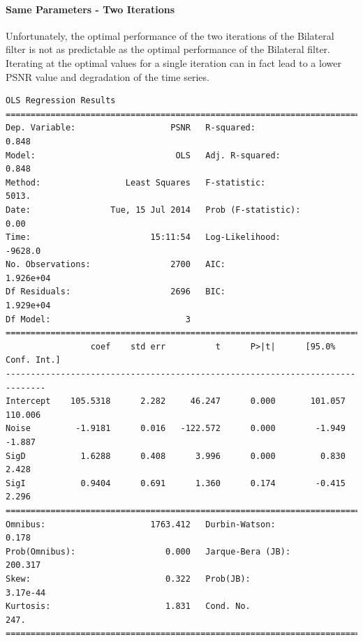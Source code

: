 \documentclass[11pt]{article}
\theoremstyle{definition}
\begin{document}
\paragraph{Same Parameters - Two Iterations}

Unfortunately, the optimal performance of the two iterations of the Bilateral filter is not as predictable as the optimal performance of the Bilateral filter. Iterating at the optimal values for a single iteration can in fact lead to a lower PSNR value and degradation of the time series.

{\footnotesize
\begin{lstlisting}[caption = Time Series 1 - Bilateral Filter 2 Same Iterations OLS Model, label = {2samebilateral1}]
                            OLS Regression Results                            
==============================================================================
Dep. Variable:                   PSNR   R-squared:                       0.848
Model:                            OLS   Adj. R-squared:                  0.848
Method:                 Least Squares   F-statistic:                     5013.
Date:                Tue, 15 Jul 2014   Prob (F-statistic):               0.00
Time:                        15:11:54   Log-Likelihood:                -9628.0
No. Observations:                2700   AIC:                         1.926e+04
Df Residuals:                    2696   BIC:                         1.929e+04
Df Model:                           3                                         
==============================================================================
                 coef    std err          t      P>|t|      [95.0% Conf. Int.]
------------------------------------------------------------------------------
Intercept    105.5318      2.282     46.247      0.000       101.057   110.006
Noise         -1.9181      0.016   -122.572      0.000        -1.949    -1.887
SigD           1.6288      0.408      3.996      0.000         0.830     2.428
SigI           0.9404      0.691      1.360      0.174        -0.415     2.296
==============================================================================
Omnibus:                     1763.412   Durbin-Watson:                   0.178
Prob(Omnibus):                  0.000   Jarque-Bera (JB):              200.317
Skew:                           0.322   Prob(JB):                     3.17e-44
Kurtosis:                       1.831   Cond. No.                         247.
==============================================================================
\end{lstlisting}

}
\end{document}
